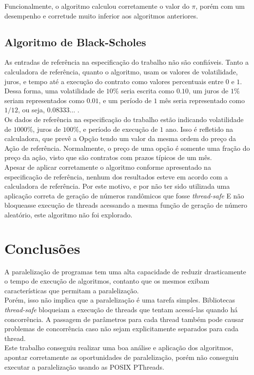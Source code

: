 \documentclass[12pt]{article}
\begin{document}
Funcionalmente, o algoritmo calculou corretamente o valor do $\pi$, porém com um desempenho
e corretude muito inferior aos algoritmos anteriores.\\

\subsection{Algoritmo de Black-Scholes}

As entradas de referência na especificação do trabalho não são confiáveis.
Tanto a calculadora de referência, quanto o algoritmo, usam os valores de volatilidade, juros,
e tempo até a execução do contrato como valores percentuais entre $0$ e $1$. Dessa forma, uma
volatilidade de $10\%$ seria escrita como $0.10$, um juros de $1\%$ seriam representados como
$0.01$, e um período de $1$ mês seria representado como $1/12$, ou seja, $0.08333\dots$ .\\

Os dados de referência na especificação do trabalho estão indicando volatilidade de
$1000\%$, juros de $100\%$, e período de execução de $1$ ano.
Isso é refletido na calculadora, que prevê a Opção tendo um valor da mesma ordem do preço da
Ação de referência. Normalmente, o preço de uma opção é somente uma fração do preço da ação,
visto que são contratos com prazos típicos de um mês.\\

Apesar de aplicar corretamente o algoritmo conforme apresentado na especificação de referência,
nenhum dos resultados esteve em acordo com a calculadora de referência. Por este motivo,
e por não ter sido utilizada uma aplicação correta de geração de números randômicos que
fosse \textit{thread-safe} E não bloqueasse execução de threads acessando a mesma função de
geração de número aleatório, este algoritmo não foi explorado.\\

\section{Conclusões}

A paralelização de programas tem uma alta capacidade de reduzir drasticamente o tempo
de execução de algoritmos, contanto que os mesmos exibam características que permitam a
paralelização.\\

Porém, isso não implica que a paralelização é uma tarefa simples. Bibliotecas
\textit{thread-safe} bloqueiam a execução de threads que tentam acessá-las quando há
concorrência. A passagem de parâmetros para cada thread também pode causar problemas de
concorrência caso não sejam explicitamente separados para cada thread.\\

Este trabalho conseguiu realizar uma boa análise e aplicação dos algoritmos, apontar
corretamente as oportunidades de paralelização, porém não conseguiu executar a paralelização
usando as POSIX PThreads.



\end{document}
